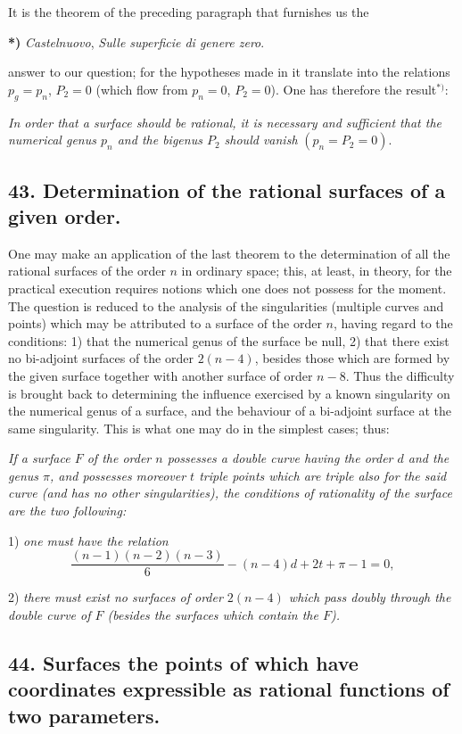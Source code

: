 \documentclass{article}
\begin{document}
It is the theorem of the preceding paragraph that furnishes us the

\textbf{*)} \emph{Castelnuovo}, \emph{Sulle superficie di genere zero}.

answer to our question; for the hypotheses made in it translate into the relations $p_{g} = p_{n}$, $P_{2} = 0$ (which flow from $p_{n} = 0$, $P_{2} = 0$). One has therefore the result${}^{*)}$:

\emph{In order that a surface should be rational, it is necessary and sufficient that the numerical genus $p_{n}$ and the bigenus $P_{2}$ should vanish} $(p_{n} = P_{2} = 0)$.

\subsection*{43. Determination of the rational surfaces of a given order.}

One may make an application of the last theorem to the determination of all the rational surfaces of the order $n$ in ordinary space; this, at least, in theory, for the practical execution requires notions which one does not possess for the moment. The question is reduced to the analysis of the singularities (multiple curves and points) which may be attributed to a surface of the order $n$, having regard to the conditions: 1) that the numerical genus of the surface be null, 2) that there exist no bi-adjoint surfaces of the order $2(n-4)$, besides those which are formed by the given surface together with another surface of order $n - 8$. Thus the difficulty is brought back to determining the influence exercised by a known singularity on the numerical genus of a surface, and the behaviour of a bi-adjoint surface at the same singularity. This is what one may do in the simplest cases; thus:

\emph{If a surface $F$ of the order $n$ possesses a double curve having the order $d$ and the genus $\pi$, and possesses moreover $t$ triple points which are triple also for the said curve (and has no other singularities), the conditions of rationality of the surface are the two following:}

1) \emph{one must have the relation}
\[ \frac{(n-1)(n-2)(n-3)}{6} - (n-4)d + 2t + \pi - 1 = 0, \]

2) \emph{there must exist no surfaces of order $2(n-4)$ which pass doubly through the double curve of $F$ (besides the surfaces which contain the $F$).}

\subsection*{44. Surfaces the points of which have coordinates expressible as rational functions of two parameters.}
\end{document}
